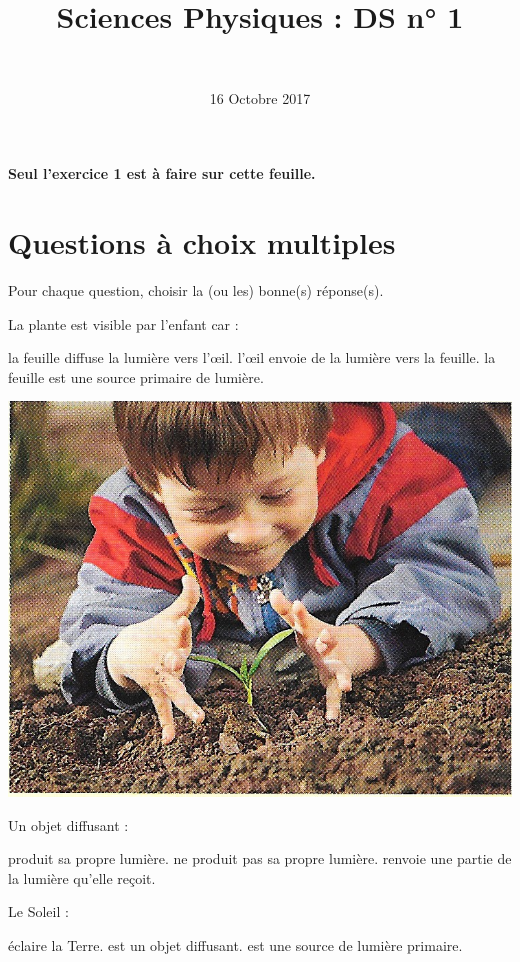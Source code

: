 \documentclass[a4paper,11pt]{exam}
\author{\ }
\date{16 Octobre 2017}
\title{Sciences Physiques : DS n° 1}
\begin{document}
%	

	\maketitle

\begin{center}
	{\Large \textbf{Seul l'exercice 1 est à faire sur cette feuille.}}
\end{center}
\section{Questions à choix multiples}
Pour chaque question, choisir la (ou les) bonne(s) réponse(s).

\begin{questions}
	\question La plante est visible par l'enfant car :
	\begin{multicols}{2}
		
		\begin{checkboxes}
			\choice la feuille diffuse la lumière vers l'\oe il.
			\choice l'\oe il envoie de la lumière vers la feuille.
			\choice la feuille est une source primaire de lumière.
		\end{checkboxes}
	
		\includegraphics[scale=0.2]{vision_herbe}
	\end{multicols}
	
	
	\question Un objet diffusant :
	
	\begin{checkboxes}
		\choice produit sa propre lumière.
		\choice ne produit pas sa propre lumière.
		\choice renvoie une partie de la lumière qu'elle reçoit.
	\end{checkboxes}

	\question Le Soleil :
	
	\begin{checkboxes}
		\choice éclaire la Terre.
		\choice est un objet diffusant.
		\choice est une source de lumière primaire.
	\end{checkboxes}


\end{questions}
\end{document}
